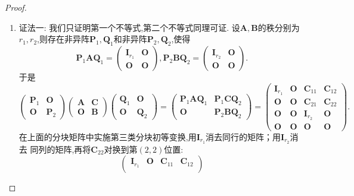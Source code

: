 \documentclass[lang=cn,newtx,10pt,scheme=chinese]{elegantbook}
\begin{document}
\begin{proof}
\begin{enumerate}[(1)]
\item  {\color{blue}证法一:} 我们只证明第一个不等式,第二个不等式同理可证. 设\(\boldsymbol{A},\boldsymbol{B}\)的秩分别为\(r_1,r_2\),则存在非异阵\(\boldsymbol{P}_1,\boldsymbol{Q}_1\)和非异阵\(\boldsymbol{P}_2,\boldsymbol{Q}_2\),使得
\[
\boldsymbol{P}_1\boldsymbol{A}\boldsymbol{Q}_1=\begin{pmatrix}
\boldsymbol{I}_{r_1}&\boldsymbol{O}\\
\boldsymbol{O}&\boldsymbol{O}
\end{pmatrix}, \boldsymbol{P}_2\boldsymbol{B}\boldsymbol{Q}_2=\begin{pmatrix}
\boldsymbol{I}_{r_2}&\boldsymbol{O}\\
\boldsymbol{O}&\boldsymbol{O}
\end{pmatrix}.
\]
于是
\[
\begin{pmatrix}
\boldsymbol{P}_1&\boldsymbol{O}\\
\boldsymbol{O}&\boldsymbol{P}_2
\end{pmatrix}
\begin{pmatrix}
\boldsymbol{A}&\boldsymbol{C}\\
\boldsymbol{O}&\boldsymbol{B}
\end{pmatrix}
\begin{pmatrix}
\boldsymbol{Q}_1&\boldsymbol{O}\\
\boldsymbol{O}&\boldsymbol{Q}_2
\end{pmatrix}=
\begin{pmatrix}
\boldsymbol{P}_1\boldsymbol{A}\boldsymbol{Q}_1&\boldsymbol{P}_1\boldsymbol{C}\boldsymbol{Q}_2\\
\boldsymbol{O}&\boldsymbol{P}_2\boldsymbol{B}\boldsymbol{Q}_2
\end{pmatrix}=
\begin{pmatrix}
\boldsymbol{I}_{r_1}&\boldsymbol{O}&\boldsymbol{C}_{11}&\boldsymbol{C}_{12}\\
\boldsymbol{O}&\boldsymbol{O}&\boldsymbol{C}_{21}&\boldsymbol{C}_{22}\\
\boldsymbol{O}&\boldsymbol{O}&\boldsymbol{I}_{r_2}&\boldsymbol{O}\\
\boldsymbol{O}&\boldsymbol{O}&\boldsymbol{O}&\boldsymbol{O}
\end{pmatrix}.
\]
在上面的分块矩阵中实施第三类分块初等变换,用\(\boldsymbol{I}_{r_1}\)消去同行的矩阵；用\(\boldsymbol{I}_{r_2}\)消去
同列的矩阵,再将\(\boldsymbol{C}_{22}\)对换到第\((2,2)\)位置:
\[
\begin{pmatrix}
\boldsymbol{I}_{r_1}&\boldsymbol{O}&\boldsymbol{C}_{11}&\boldsymbol{C}_{12}\\

\end{pmatrix}\]
\end{enumerate}
\end{proof}
\end{document}
